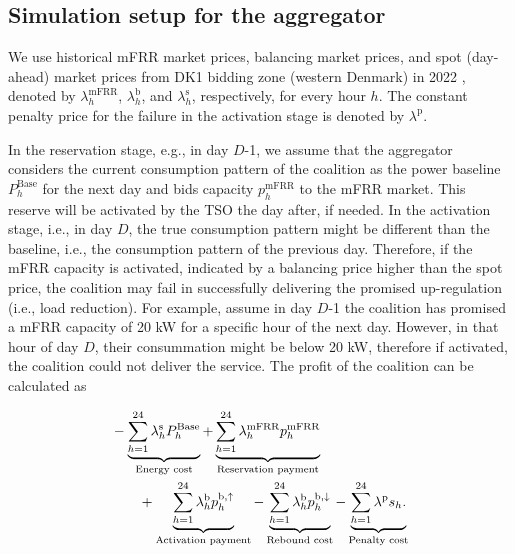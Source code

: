 \documentclass[conference]{IEEEtran}
\begin{document}
\subsection{Simulation setup for the aggregator}
We use historical mFRR market prices, balancing market prices, and spot (day-ahead) market prices from DK1 bidding zone (western Denmark) in 2022 \cite{energinet:energidataservice}, denoted by $\lambda_{h}^{\text{mFRR}}$, $\lambda_{h}^{\text{b}}$, and $\lambda_{h}^{\text{s}}$, respectively, for every hour $h$. The constant penalty price for the failure in the activation stage is denoted by $\lambda^{\text{p}}$. %

In the reservation stage, e.g., in day $D$-1, we assume that the aggregator considers the current consumption pattern of the coalition as the power baseline $P^{\text{Base}}_{h}$ for the next day and bids capacity $p^{\text{mFRR}}_{h}$ to the mFRR market. This reserve will be activated by the TSO the day after, if needed. In the activation stage, i.e., in day $D$, the true consumption pattern might be different than the baseline, i.e., the consumption pattern of the previous day. Therefore, if the mFRR capacity is activated, indicated by a balancing price higher than the spot price, the coalition may fail in successfully delivering the promised up-regulation (i.e., load reduction). For example, assume in day $D$-1 the coalition has promised a mFRR capacity of 20 kW for a specific hour of the next day. However, in that hour of day $D$, their consummation might be below 20 kW, therefore if activated, the coalition could not deliver the service. The profit of the coalition can be calculated as

\begin{align}\label{eq:mFRRObjective}
     & - \underbrace{\sum_{h=1}^{24} \lambda^{\text{s}}_{h}P^{\text{Base}}_{h}}_{\textrm{Energy cost}} + \underbrace{\sum_{h=1}^{24}\lambda_{h}^{\text{mFRR}} p^{\text{mFRR}}_{h}}_{\textrm{Reservation payment}}  \notag \\ & \quad \quad + \underbrace{\sum_{h=1}^{24}  \lambda_{h}^{\text{b}} p^{\text{b},\uparrow}_{h}}_{\textrm{Activation payment}} - \underbrace{\sum_{h=1}^{24}  \lambda_{h}^{\text{b}} p^{\text{b},\downarrow}_{h}}_{\textrm{Rebound cost}} - \underbrace{ \sum_{h=1}^{24}  \lambda^{\text{p}}s_{h}.}_{\textrm{Penalty cost}}
\end{align}
\end{document}
